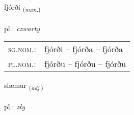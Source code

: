 \documentclass[frontgrid, backgrid]{flacards}\usepackage[]{graphicx}\usepackage[]{xcolor}
\begin{document}
\renewcommand{\flhead}{\vskip5pt \fboxsep=0pt {\small\bfseries\footnotesize Töluorð | Numeral}}
\renewcommand{\fcfoot}{\vskip5pt \fboxsep=0pt \hspace{2pt}{\small\bfseries\footnotesize 2K}}

\renewcommand{\blhead}{\vskip5pt {\small\bfseries\footnotesize Töluorð | Numeral }}
\renewcommand{\bcfoot}{\vskip5pt \hspace{2pt}{\small\bfseries\footnotesize 2K}}


{fjórði \small{\textsubscript{(\textit{num.})}} \\[1ex] %
\textphonetic{[fjourðɪ]} \\
pl.: \emph{czwarty} \\  [2ex]
\renewcommand*{\arraystretch}{0.8}
\begin{tabular}{ll}
\textsc{sg.nom.}: & fjórði  --  fjórða -- fjórða \\ 
\textsc{pl.nom.}: & fjórðu -- fjórðu -- fjórðu
\end{tabular}
}

\renewcommand{\flhead}{\vskip5pt \fboxsep=0pt {\small\bfseries\footnotesize Lýsingarorð | Adjective}}
\renewcommand{\fcfoot}{\vskip5pt \fboxsep=0pt \hspace{2pt}{\small\bfseries\footnotesize 2K}}

\renewcommand{\blhead}{\vskip5pt {\small\bfseries\footnotesize Lýsingarorð | Adjective }}
\renewcommand{\bcfoot}{\vskip5pt \hspace{2pt}{\small\bfseries\footnotesize 2K}}


{slæmur \small{\textsubscript{(\textit{adj.})}} \\[1ex] %
\textphonetic{[stlaiːmʏr]} \\
pl.: \emph{zły} \\  [2ex]
\renewcommand*{\arraystretch}{0.8}
}
\end{document}
